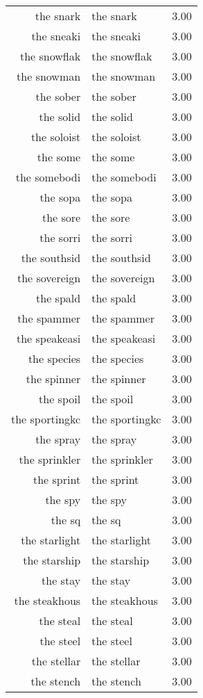 \begin{table}[ht]
\begin{tabular}{rlr}
  the snark & the snark & 3.00 \\ 
  the sneaki & the sneaki & 3.00 \\ 
  the snowflak & the snowflak & 3.00 \\ 
  the snowman & the snowman & 3.00 \\ 
  the sober & the sober & 3.00 \\ 
  the solid & the solid & 3.00 \\ 
  the soloist & the soloist & 3.00 \\ 
  the some & the some & 3.00 \\ 
  the somebodi & the somebodi & 3.00 \\ 
  the sopa & the sopa & 3.00 \\ 
  the sore & the sore & 3.00 \\ 
  the sorri & the sorri & 3.00 \\ 
  the southsid & the southsid & 3.00 \\ 
  the sovereign & the sovereign & 3.00 \\ 
  the spald & the spald & 3.00 \\ 
  the spammer & the spammer & 3.00 \\ 
  the speakeasi & the speakeasi & 3.00 \\ 
  the species & the species & 3.00 \\ 
  the spinner & the spinner & 3.00 \\ 
  the spoil & the spoil & 3.00 \\ 
  the sportingkc & the sportingkc & 3.00 \\ 
  the spray & the spray & 3.00 \\ 
  the sprinkler & the sprinkler & 3.00 \\ 
  the sprint & the sprint & 3.00 \\ 
  the spy & the spy & 3.00 \\ 
  the sq & the sq & 3.00 \\ 
  the starlight & the starlight & 3.00 \\ 
  the starship & the starship & 3.00 \\ 
  the stay & the stay & 3.00 \\ 
  the steakhous & the steakhous & 3.00 \\ 
  the steal & the steal & 3.00 \\ 
  the steel & the steel & 3.00 \\ 
  the stellar & the stellar & 3.00 \\ 
  the stench & the stench & 3.00 \\ 

\end{tabular}
\end{table}
